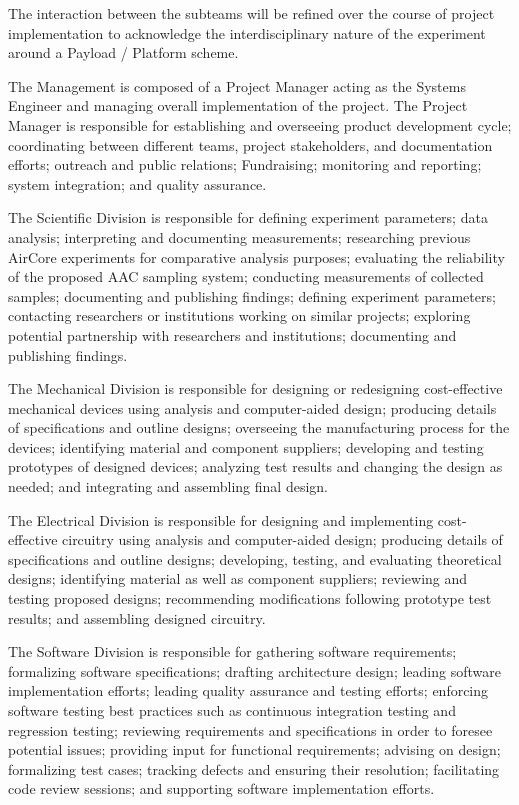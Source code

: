 \documentclass[a4paper,12pt,twoside]{article}
\begin{document}
The interaction between the subteams will be refined over the course of project implementation to acknowledge the interdisciplinary nature of the experiment around a Payload / Platform scheme.

The Management is composed of a Project Manager acting as the Systems Engineer and managing overall implementation of the project. The Project Manager is responsible for establishing and overseeing product development cycle; coordinating between different teams, project stakeholders, and documentation efforts; outreach and public relations; Fundraising; monitoring and reporting; system integration; and quality assurance.

The Scientific Division is responsible for defining experiment parameters; data analysis; interpreting and documenting measurements; researching previous AirCore experiments for comparative analysis purposes; evaluating the reliability of the proposed AAC sampling system; conducting measurements of collected samples; documenting and publishing findings; defining experiment parameters; contacting researchers or institutions working on similar projects; exploring potential partnership with researchers and institutions; documenting and publishing findings.

The Mechanical Division is responsible for designing or redesigning cost-effective mechanical devices using analysis and computer-aided design; producing details of specifications and outline designs; overseeing the manufacturing process for the devices; identifying material and component suppliers; developing and testing prototypes of designed devices; analyzing test results and changing the design as needed; and integrating and assembling final design.

The Electrical Division is responsible for designing and implementing cost-effective circuitry using analysis and computer-aided design; producing details of specifications and outline designs; developing, testing, and evaluating theoretical designs; identifying material as well as component suppliers; reviewing and testing proposed designs; recommending modifications following prototype test results; and assembling designed circuitry.

The Software Division is responsible for gathering software requirements; formalizing software specifications; drafting architecture design; leading software implementation efforts; leading quality assurance and testing efforts; enforcing software testing best practices such as continuous integration testing and regression testing; reviewing requirements and specifications in order to foresee potential issues; providing input for functional requirements; advising on design; formalizing test cases; tracking defects and ensuring their resolution; facilitating code review sessions; and supporting software implementation efforts.
\pagebreak
\end{document}
